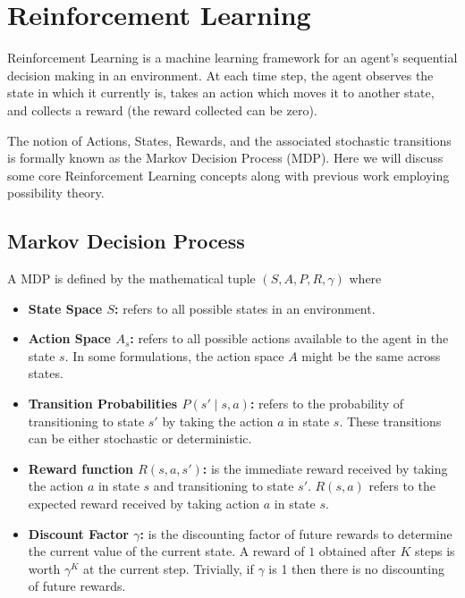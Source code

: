 \documentclass[12pt,a4paper]{report}
\begin{document}
\section{Reinforcement Learning}

Reinforcement Learning is a machine learning framework for an agent's sequential decision making in an environment. At each time step, the agent observes the state in which it currently is, takes an action which moves it to another state, and collects a reward (the reward collected can be zero). \par

The notion of Actions, States, Rewards, and the associated stochastic transitions is formally known as the Markov Decision Process (MDP). Here we will discuss some core Reinforcement Learning concepts along with previous work employing possibility theory. \par

\subsection{Markov Decision Process}

A MDP is defined by the mathematical tuple $(S, A, P, R, \gamma)$ where \par

\begin{itemize}
  \item \textbf{State Space $S$:} refers to all possible states in an environment.  
  \item \textbf{Action Space $A_s$:} refers to all possible actions available to the agent in the state $s$. In some formulations, the action space $A$ might be the same across states. 
  \item \textbf{Transition Probabilities $P(s' \mid s, a)$:} refers to the probability of transitioning to state $s'$ by taking the action $a$ in state $s$. These transitions can be either stochastic or deterministic.   
  \item \textbf{Reward function $R(s, a, s')$:} is the immediate reward received by taking the action $a$ in state $s$ and transitioning to state $s'$. $R(s, a)$ refers to the expected reward received by taking action $a$ in state $s$.  
  \item \textbf{Discount Factor $\gamma$:} is the discounting factor of future rewards to determine the current value of the current state. A reward of $1$ obtained after $K$ steps is worth $\gamma^K$ at the current step. Trivially, if $\gamma$ is 1 then there is no discounting of future rewards.    
\end{itemize} \par
\end{document}
